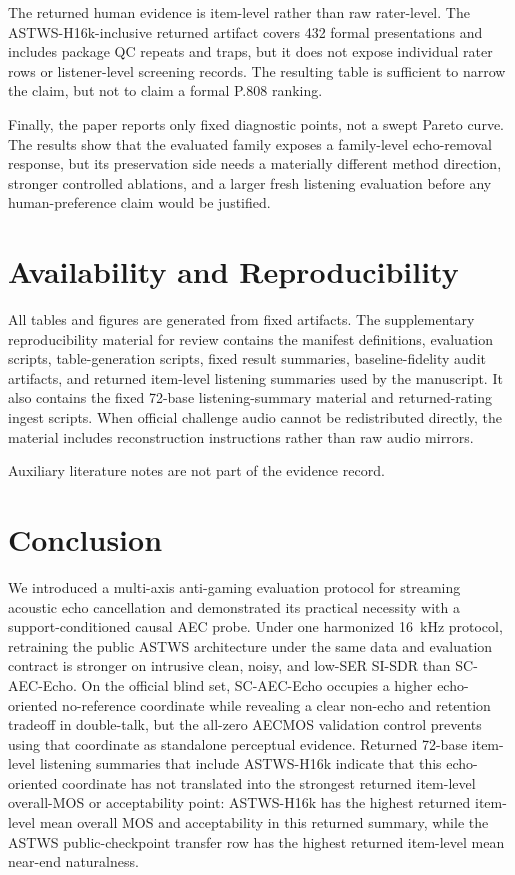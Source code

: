 \documentclass[journal]{IEEEtran}
\begin{document}
The returned human evidence is item-level rather than raw rater-level. The ASTWS-H16k-inclusive returned artifact covers 432 formal presentations and includes package QC repeats and traps, but it does not expose individual rater rows or listener-level screening records. The resulting table is sufficient to narrow the claim, but not to claim a formal P.808 ranking.

Finally, the paper reports only fixed diagnostic points, not a swept Pareto curve. The results show that the evaluated family exposes a family-level echo-removal response, but its preservation side needs a materially different method direction, stronger controlled ablations, and a larger fresh listening evaluation before any human-preference claim would be justified.

\section{Availability and Reproducibility}
All tables and figures are generated from fixed artifacts. The supplementary reproducibility material for review contains the manifest definitions, evaluation scripts, table-generation scripts, fixed result summaries, baseline-fidelity audit artifacts, and returned item-level listening summaries used by the manuscript. It also contains the fixed 72-base listening-summary material and returned-rating ingest scripts. When official challenge audio cannot be redistributed directly, the material includes reconstruction instructions rather than raw audio mirrors.

Auxiliary literature notes are not part of the evidence record.

\section{Conclusion}
We introduced a multi-axis anti-gaming evaluation protocol for streaming acoustic echo cancellation and demonstrated its practical necessity with a support-conditioned causal AEC probe. Under one harmonized 16~kHz protocol, retraining the public ASTWS architecture under the same data and evaluation contract is stronger on intrusive clean, noisy, and low-SER SI-SDR than SC-AEC-Echo. On the official blind set, SC-AEC-Echo occupies a higher echo-oriented no-reference coordinate while revealing a clear non-echo and retention tradeoff in double-talk, but the all-zero AECMOS validation control prevents using that coordinate as standalone perceptual evidence. Returned 72-base item-level listening summaries that include ASTWS-H16k indicate that this echo-oriented coordinate has not translated into the strongest returned item-level overall-MOS or acceptability point: ASTWS-H16k has the highest returned item-level mean overall MOS and acceptability in this returned summary, while the ASTWS public-checkpoint transfer row has the highest returned item-level mean near-end naturalness.
\end{document}

